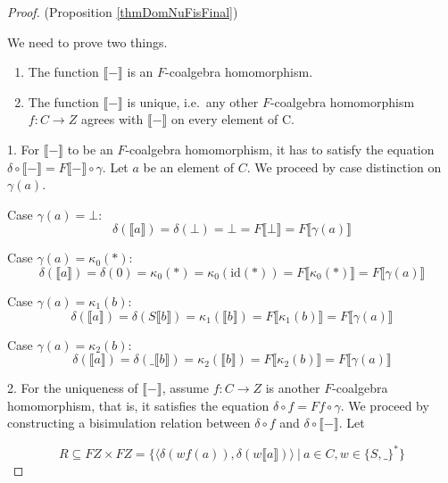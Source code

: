 \documentclass[a4paper]{article}
\newcommand{\arr}{\rightarrow}
\newcommand{\semantics}[1]{\llbracket #1 \rrbracket}
\begin{document}
\begin{proof}{(Proposition \ref{thmDomNuFisFinal})}

We need to prove two things.

  \begin{enumerate}
  \item
    The function $\semantics{-}$ is an $F$-coalgebra homomorphism.
  \item
    The function $\semantics{-}$ is unique, i.e.~any other $F$-coalgebra
    homomorphism $f : C \arr Z$ agrees with $\semantics{-}$ on every element of C.
  \end{enumerate}

1. For $\semantics{-}$ to be an
$F$-coalgebra homomorphism, it has to satisfy the equation $\delta \circ
\semantics{-} = F\semantics{-} \circ \gamma$.  Let $a$ be an element of $C$. We
proceed by case distinction on $\gamma(a)$.

Case $\gamma(a) = \bot$:
\begin{equation*}
\delta(\semantics{a}) = \delta(\bot) = \bot =
F\semantics{\bot} = F\semantics{\gamma(a)}
\end{equation*}

Case $\gamma(a) = \kappa_0(*)$:
\begin{equation*}
\delta(\semantics{a}) = \delta(0) = \kappa_0(*)
= \kappa_0(\text{id}(*)) = F\semantics{\kappa_0(*)} = F\semantics{\gamma(a)}
\end{equation*}

Case $\gamma(a) = \kappa_1(b)$:
\begin{equation*}
\delta(\semantics{a}) = \delta(S \semantics{b}) = \kappa_1(\semantics{b}) =
F\semantics{\kappa_1(b)} = F\semantics{\gamma(a)}
\end{equation*}

Case $\gamma(a) = \kappa_2(b)$:
\begin{equation*}
\delta(\semantics{a}) = \delta(\_ \semantics{b}) = \kappa_2(\semantics{b}) =
F\semantics{\kappa_2(b)} = F\semantics{\gamma(a)}
\end{equation*}

2. For the uniqueness of $\semantics{-}$, assume $f : C \arr Z$ is another
$F$-coalgebra homomorphism, that is, it satisfies the equation $\delta \circ f =
Ff \circ \gamma$.  We proceed by constructing a bisimulation relation between
$\delta \circ f$ and $\delta \circ \semantics{-}$.  Let

\begin{equation*}
R \subseteq FZ \times FZ =
  \{ \langle \delta(wf(a)) , \delta(w\semantics{a}) \rangle
   \ |\  a \in C, w \in \{ S, \_ \}^*
  \}
\end{equation*}


\end{proof}
\end{document}
